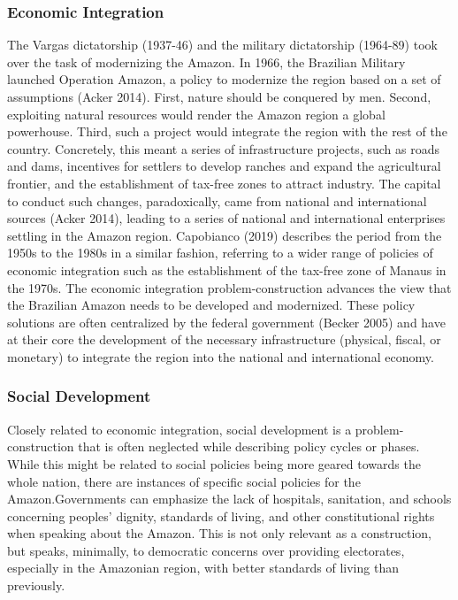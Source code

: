\documentclass[
]{article}
\begin{document}
\hypertarget{economic-integration}{%
\subsubsection{Economic Integration}\label{economic-integration}}

The Vargas dictatorship (1937-46) and the military dictatorship
(1964-89) took over the task of modernizing the Amazon. In 1966, the
Brazilian Military launched Operation Amazon, a policy to modernize the
region based on a set of assumptions (Acker 2014). First, nature should
be conquered by men. Second, exploiting natural resources would render
the Amazon region a global powerhouse. Third, such a project would
integrate the region with the rest of the country. Concretely, this
meant a series of infrastructure projects, such as roads and dams,
incentives for settlers to develop ranches and expand the agricultural
frontier, and the establishment of tax-free zones to attract industry.
The capital to conduct such changes, paradoxically, came from national
and international sources (Acker 2014), leading to a series of national
and international enterprises settling in the Amazon region. Capobianco
(2019) describes the period from the 1950s to the 1980s in a similar
fashion, referring to a wider range of policies of economic integration
such as the establishment of the tax-free zone of Manaus in the 1970s.
The economic integration problem-construction advances the view that the
Brazilian Amazon needs to be developed and modernized. These policy
solutions are often centralized by the federal government (Becker 2005)
and have at their core the development of the necessary infrastructure
(physical, fiscal, or monetary) to integrate the region into the
national and international economy.

\hypertarget{social-development}{%
\subsubsection{Social Development}\label{social-development}}

Closely related to economic integration, social development is a
problem-construction that is often neglected while describing policy
cycles or phases. While this might be related to social policies being
more geared towards the whole nation, there are instances of specific
social policies for the Amazon.Governments can emphasize the lack of
hospitals, sanitation, and schools concerning peoples' dignity,
standards of living, and other constitutional rights when speaking about
the Amazon. This is not only relevant as a construction, but speaks,
minimally, to democratic concerns over providing electorates, especially
in the Amazonian region, with better standards of living than
previously.
\end{document}
